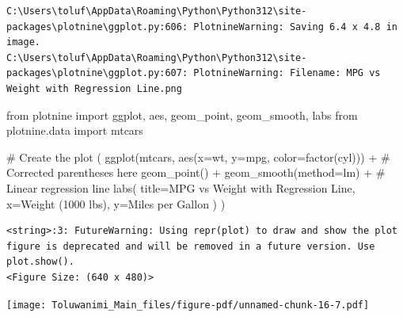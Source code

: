 \documentclass[
  letterpaper,
  DIV=11,
  numbers=noendperiod]{scrreprt}
\newenvironment{Shaded}{\begin{snugshade}}{\end{snugshade}}
\newcommand{\CommentTok}[1]{\textcolor[rgb]{0.37,0.37,0.37}{#1}}
\newcommand{\ImportTok}[1]{\textcolor[rgb]{0.00,0.46,0.62}{#1}}
\newcommand{\NormalTok}[1]{\textcolor[rgb]{0.00,0.23,0.31}{#1}}
\newcommand{\OperatorTok}[1]{\textcolor[rgb]{0.37,0.37,0.37}{#1}}
\newcommand{\StringTok}[1]{\textcolor[rgb]{0.13,0.47,0.30}{#1}}
\begin{document}
\begin{verbatim}
C:\Users\toluf\AppData\Roaming\Python\Python312\site-packages\plotnine\ggplot.py:606: PlotnineWarning: Saving 6.4 x 4.8 in image.
C:\Users\toluf\AppData\Roaming\Python\Python312\site-packages\plotnine\ggplot.py:607: PlotnineWarning: Filename: MPG vs Weight with Regression Line.png
\end{verbatim}

\begin{Shaded}
\begin{Highlighting}[]
\ImportTok{from}\NormalTok{ plotnine }\ImportTok{import}\NormalTok{ ggplot, aes, geom\_point, geom\_smooth, labs}
\ImportTok{from}\NormalTok{ plotnine.data }\ImportTok{import}\NormalTok{ mtcars}

\CommentTok{\# Create the plot}
\NormalTok{(}
\NormalTok{    ggplot(mtcars, aes(x}\OperatorTok{=}\StringTok{\textquotesingle{}wt\textquotesingle{}}\NormalTok{, y}\OperatorTok{=}\StringTok{\textquotesingle{}mpg\textquotesingle{}}\NormalTok{, color}\OperatorTok{=}\StringTok{\textquotesingle{}factor(cyl)\textquotesingle{}}\NormalTok{)) }\OperatorTok{+}  \CommentTok{\# Corrected parentheses here}
\NormalTok{    geom\_point() }\OperatorTok{+}
\NormalTok{    geom\_smooth(method}\OperatorTok{=}\StringTok{\textquotesingle{}lm\textquotesingle{}}\NormalTok{) }\OperatorTok{+}  \CommentTok{\# Linear regression line}
\NormalTok{    labs(}
\NormalTok{        title}\OperatorTok{=}\StringTok{\textquotesingle{}MPG vs Weight with Regression Line\textquotesingle{}}\NormalTok{,}
\NormalTok{        x}\OperatorTok{=}\StringTok{\textquotesingle{}Weight (1000 lbs)\textquotesingle{}}\NormalTok{,}
\NormalTok{        y}\OperatorTok{=}\StringTok{\textquotesingle{}Miles per Gallon\textquotesingle{}}
\NormalTok{    )}
\NormalTok{)}
\end{Highlighting}
\end{Shaded}

\begin{verbatim}
<string>:3: FutureWarning: Using repr(plot) to draw and show the plot figure is deprecated and will be removed in a future version. Use plot.show().
<Figure Size: (640 x 480)>
\end{verbatim}

\texttt{[image: Toluwanimi\_Main\_files/figure-pdf/unnamed-chunk-16-7.pdf]}
\end{document}
